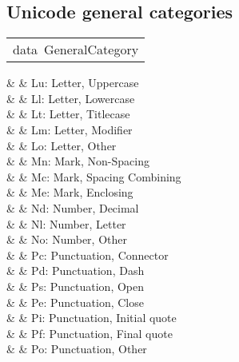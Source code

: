 \subsection{Unicode general categories
}
\begin{haddockdesc}
\item[\begin{tabular}{@{}l}
data\ GeneralCategory
\end{tabular}]\haddockbegindoc
\haddockbeginconstrs
\haddockdecltt{=} &  & Lu: Letter, Uppercase
 \\
\haddockdecltt{|} &  & Ll: Letter, Lowercase
 \\
\haddockdecltt{|} &  & Lt: Letter, Titlecase
 \\
\haddockdecltt{|} &  & Lm: Letter, Modifier
 \\
\haddockdecltt{|} &  & Lo: Letter, Other
 \\
\haddockdecltt{|} &  & Mn: Mark, Non-Spacing
 \\
\haddockdecltt{|} &  & Mc: Mark, Spacing Combining
 \\
\haddockdecltt{|} &  & Me: Mark, Enclosing
 \\
\haddockdecltt{|} &  & Nd: Number, Decimal
 \\
\haddockdecltt{|} &  & Nl: Number, Letter
 \\
\haddockdecltt{|} &  & No: Number, Other
 \\
\haddockdecltt{|} &  & Pc: Punctuation, Connector
 \\
\haddockdecltt{|} &  & Pd: Punctuation, Dash
 \\
\haddockdecltt{|} &  & Ps: Punctuation, Open
 \\
\haddockdecltt{|} &  & Pe: Punctuation, Close
 \\
\haddockdecltt{|} &  & Pi: Punctuation, Initial quote
 \\
\haddockdecltt{|} &  & Pf: Punctuation, Final quote
 \\
\haddockdecltt{|} &  & Po: Punctuation, Other
 \\

\end{haddockdesc}
